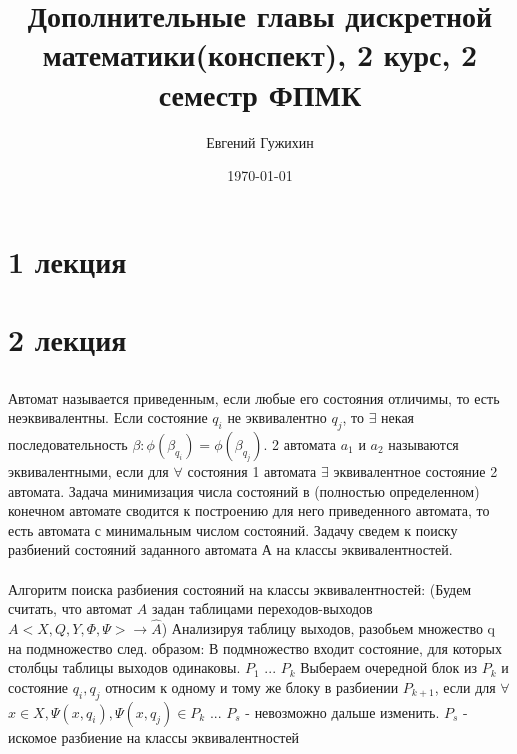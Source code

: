 \documentclass[a5paper,10pt]{article}
\author{Евгений Гужихин}
\title{Дополнительные главы дискретной математики(конспект), 2 курс, 2 семестр ФПМК}
\date{\today}
\begin{document}
	\maketitle
	\tableofcontents{}
	\newpage

	\section{1 лекция}

	\section{2 лекция}
		\subsection{}
			\paragraph{}
				Автомат называется приведенным, если любые его состояния отличимы, то есть неэквивалентны.
				Если состояние $q_i$ не эквивалентно $q_j$, то $\exists$ некая последовательность $\beta: \phi(\beta_{q_i})=\phi(\beta_{q_j})$.
				2 автомата $a_1$ и $a_2$ называются эквивалентными, если для $\forall$ состояния 1 автомата $\exists$ эквивалентное состояние 2 автомата.
				Задача минимизация числа состояний в (полностью определенном) конечном автомате сводится к построению для него приведенного автомата, то есть автомата с минимальным числом состояний.
				Задачу сведем к поиску разбиений состояний заданного автомата А на классы эквивалентностей.

			\paragraph{}
				Алгоритм поиска разбиения состояний на классы эквивалентностей:
				(Будем считать, что автомат $A$ задан таблицами переходов-выходов
				$ A<X,Q,Y,\Phi,\Psi> \rightarrow \hat A $)
				Анализируя таблицу выходов, разобьем множество q на подмножество след. образом:
					В подмножество входит состояние, для которых столбцы таблицы выходов одинаковы.
					$P_1$
					...
					$P_k$
					Выбераем очередной блок из $P_k$ и состояние $q_i, q_j$ относим к одному и тому же блоку в разбиении $P_{k+1}$, если для $\forall$ $x \in X, \Psi(x,q_i),\Psi(x,q_j) \in P_k$
					...
					$P_s$ - невозможно дальше изменить. $P_s$ - искомое разбиение на классы эквивалентностей
\end{document}
